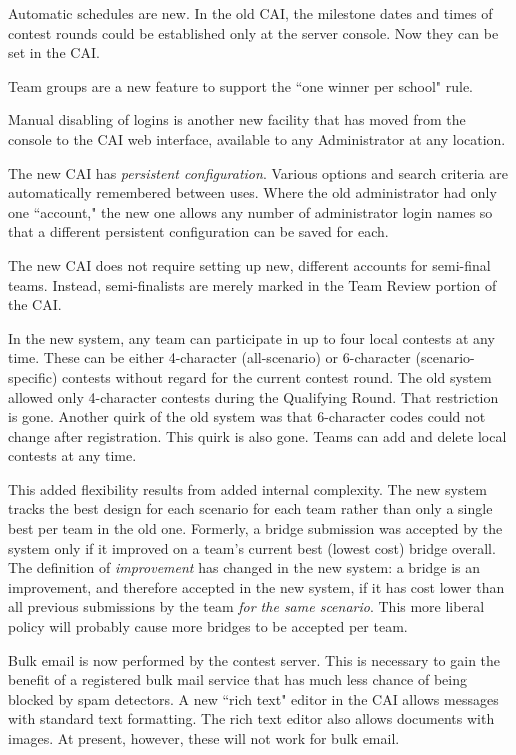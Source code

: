 \documentclass[11pt,letterpaper]{refart}
\begin{document}
Automatic schedules are new. In the old CAI, the milestone dates and
times of contest rounds could be established only at the server
console. Now they can be set in the CAI.

Team groups are a new feature to support the ``one winner per school"
rule.

Manual disabling of logins is another new facility that has moved from
the console to the CAI web interface, available to any Administrator
at any location.

The new CAI has \emph{persistent configuration}. Various options and
search criteria are automatically remembered between uses. Where the
old administrator had only one ``account," the new one allows any
number of administrator login names so that a different persistent
configuration can be saved for each.

The new CAI does not require setting up new, different accounts for
semi-final teams.  Instead, semi-finalists are merely marked in the
Team Review portion of the CAI.

In the new system, any team can participate in up to four local
contests at any time.  These can be either 4-character (all-scenario)
or 6-character (scenario-specific) contests without regard for the
current contest round. The old system allowed only 4-character
contests during the Qualifying Round. That restriction is
gone. Another quirk of the old system was that 6-character codes could
not change after registration. This quirk is also gone. Teams can add
and delete local contests at any time.

This added flexibility results from added internal complexity. The new
system tracks the best design for each scenario for each team rather
than only a single best per team in the old one. Formerly, a bridge
submission was accepted by the system only if it improved on a team's
current best (lowest cost) bridge overall. The definition of
\emph{improvement} has changed in the new system: a bridge is an
improvement, and therefore accepted in the new system, if it has cost
lower than all previous submissions by the team \emph{for the same
  scenario}. This more liberal policy will probably cause more bridges
to be accepted per team.

Bulk email is now performed by the contest server. This is necessary
to gain the benefit of a registered bulk mail service that has much
less chance of being blocked by spam detectors.  A new ``rich text"
editor in the CAI allows messages with standard text formatting.  The
rich text editor also allows documents with images. At present,
however, these will not work for bulk email.
\end{document}
